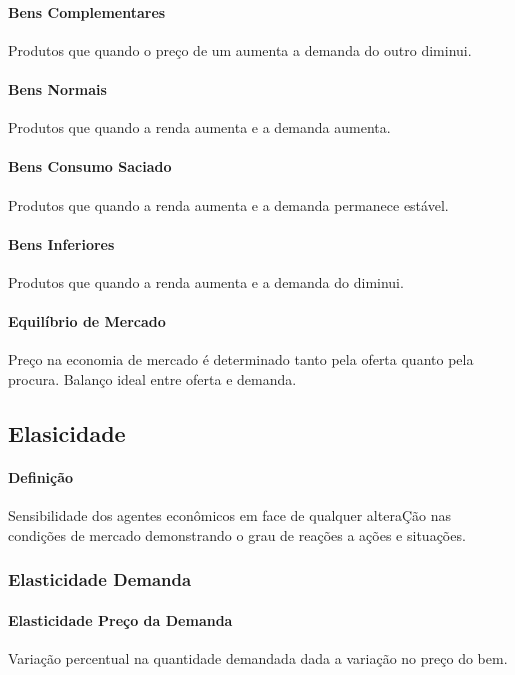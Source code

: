\documentclass{article}
\begin{document}
        \paragraph{Bens Complementares}Produtos que quando o preço de um aumenta a demanda do outro diminui.

        \paragraph{Bens Normais}Produtos que quando a renda aumenta e a demanda aumenta.

        \paragraph{Bens Consumo Saciado}Produtos que quando a renda aumenta e a demanda permanece estável.

        \paragraph{Bens Inferiores}Produtos que quando a renda aumenta e a demanda do diminui.

        \paragraph{Equilíbrio de Mercado}Preço na economia de mercado é determinado tanto pela oferta quanto pela procura. Balanço ideal entre oferta e demanda.

        \subsection{Elasicidade}
            \paragraph{Definição}Sensibilidade dos agentes econômicos em face de qualquer alteraÇão nas condições de mercado demonstrando o grau de reações a ações e situações.

            \subsubsection{Elasticidade Demanda}
                \paragraph{Elasticidade Preço da Demanda}Variação percentual na quantidade demandada dada a variação no preço do bem.
\end{document}
